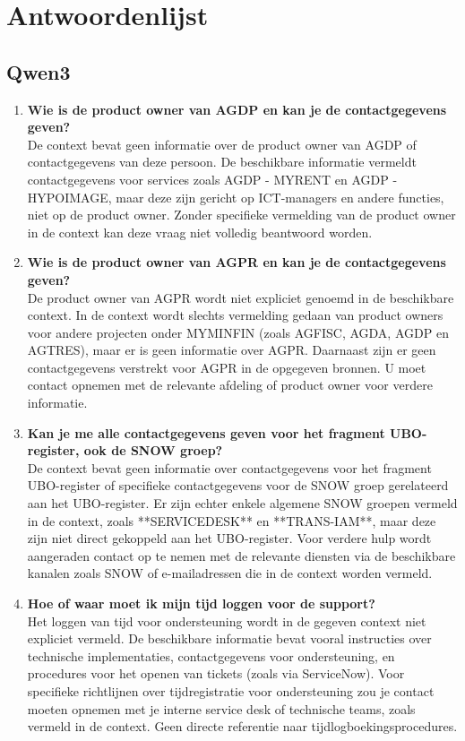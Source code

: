 \section{Antwoordenlijst}
\label{antwoordenlijst}

\subsection{Qwen3}
\begin{enumerate}
    \item \textbf{Wie is de product owner van AGDP en kan je de contactgegevens geven?} \\
    De context bevat geen informatie over de product owner van AGDP of contactgegevens van deze persoon. De beschikbare informatie vermeldt contactgegevens voor services zoals AGDP - MYRENT en AGDP - HYPOIMAGE, maar deze zijn gericht op ICT-managers en andere functies, niet op de product owner. Zonder specifieke vermelding van de product owner in de context kan deze vraag niet volledig beantwoord worden.
    
    \item \textbf{Wie is de product owner van AGPR en kan je de contactgegevens geven?} \\
    De product owner van AGPR wordt niet expliciet genoemd in de beschikbare context. In de context wordt slechts vermelding gedaan van product owners voor andere projecten onder MYMINFIN (zoals AGFISC, AGDA, AGDP en AGTRES), maar er is geen informatie over AGPR. Daarnaast zijn er geen contactgegevens verstrekt voor AGPR in de opgegeven bronnen. U moet contact opnemen met de relevante afdeling of product owner voor verdere informatie.
    
    \item \textbf{Kan je me alle contactgegevens geven voor het fragment UBO-register, ook de SNOW groep?} \\
    De context bevat geen informatie over contactgegevens voor het fragment UBO-register of specifieke contactgegevens voor de SNOW groep gerelateerd aan het UBO-register. Er zijn echter enkele algemene SNOW groepen vermeld in de context, zoals **SERVICEDESK** en **TRANS-IAM**, maar deze zijn niet direct gekoppeld aan het UBO-register. Voor verdere hulp wordt aangeraden contact op te nemen met de relevante diensten via de beschikbare kanalen zoals SNOW of e-mailadressen die in de context worden vermeld.
    
    \item \textbf{Hoe of waar moet ik mijn tijd loggen voor de support?} \\
    Het loggen van tijd voor ondersteuning wordt in de gegeven context niet expliciet vermeld. De beschikbare informatie bevat vooral instructies over technische implementaties, contactgegevens voor ondersteuning, en procedures voor het openen van tickets (zoals via ServiceNow). Voor specifieke richtlijnen over tijdregistratie voor ondersteuning zou je contact moeten opnemen met je interne service desk of technische teams, zoals vermeld in de context. Geen directe referentie naar tijdlogboekingsprocedures.
    

\end{enumerate}
